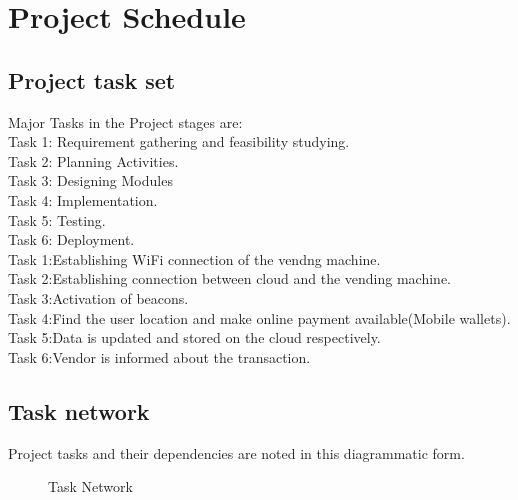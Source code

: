 \documentclass[oneside,a4paper,12pt]{report}
\begin{document}
\section{Project Schedule}  
\subsection{Project task set}  
Major Tasks in the Project stages are:\\
Task 1: Requirement gathering and feasibility studying.\\
Task 2: Planning Activities.\\
Task 3: Designing Modules\\
Task 4: Implementation. \\
Task 5: Testing.\\
Task 6: Deployment.\\



Task 1:Establishing WiFi connection of the vendng machine.\\
Task 2:Establishing connection between cloud and the vending machine.\\
Task 3:Activation of beacons.\\
Task 4:Find the user location and make online payment available(Mobile wallets). \\
Task 5:Data is updated and stored on the cloud respectively.\\
Task 6:Vendor is informed about the transaction.\\


\subsection{Task network}  
Project tasks and their dependencies are noted in this diagrammatic form.
\begin{center}
	\begin{figure}[!htbp]
		\centering
	  \caption{Task Network}
	  \label{fig:act-dig}
	\end{figure}
\end{center}  
\newpage
\end{document}

